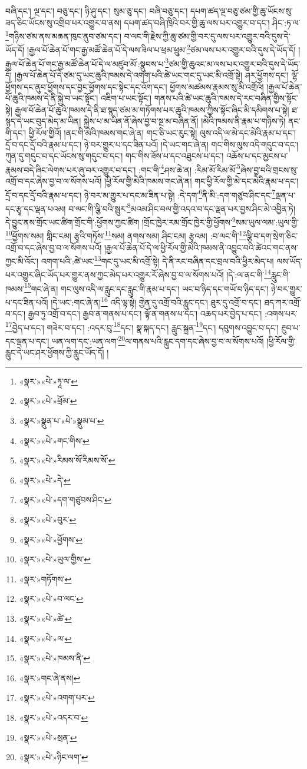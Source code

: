 བཞི་དང་། ལྔ་དང་། བཅུ་དང་། ཉི་ཤུ་དང་། སུམ་ཅུ་དང་། བཞི་བཅུ་དང་། དཔག་ཚད་ལྔ་བཅུ་ཙམ་གྱི་ཆུ་ཡོངས་སུ་ཟད་ཅིང་ཡོངས་སུ་འགྲིབ་པར་འགྱུར་བ་ནས། དཔག་ཚད་བཞི་ཁྲིའི་བར་གྱི་ཆུ་ལས་པར་འགྱུར་བ་དང་། ཤིང་:ཏ་ལ་\footnote{«སྣར་»«པེ་»ཏཱ་ལ་}གཉིས་ཙམ་ནས་མཆན་ཁུང་ནུབ་ཙམ་དང་། བ་ལང་གི་རྗེས་ཀྱི་ཆུ་ཙམ་གྱི་བར་དུ་ལས་པར་འགྱུར་བའི་དུས་དེ་ཡོད་དོ། །རྒྱལ་པོ་ཆེན་པོ་གང་རྒྱ་མཚོ་ཆེན་པོ་དེ་ལས་ཟིལ་པ་ཕྲམ་ཕྲུམ་\footnote{«སྣར་»«པེ་»ཕྲོམ་}ཙམ་ལས་པར་འགྱུར་བའི་དུས་དེ་ཡོད་དོ། །རྒྱལ་པོ་ཆེན་པོ་གང་རྒྱ་མཚོ་ཆེན་པོ་དེ་ལ་མཛུབ་མོ་:སྣུབས་པ་\footnote{«སྣར་»སྣུན་པ་«པེ་»སྣུམ་པ་}ཙམ་གྱི་ཆུའང་མ་ལས་པར་འགྱུར་བའི་དུས་དེ་ཡོད་དོ། །རྒྱལ་པོ་ཆེན་པོ་དེ་ཙམ་དུ་ཡང་ཆུའི་ཁམས་དེ་འགག་པའི་ཚེ་ཡང་གང་དུ་ཡང་མི་འགྲོ་སྟེ། ཤར་ཕྱོགས་དང་། ལྷོ་ཕྱོགས་དང་ནུབ་ཕྱོགས་དང་བྱང་ཕྱོགས་དང་སྟེང་དང་འོག་དང་། ཕྱོགས་མཚམས་རྣམས་སུ་མི་འགྲོའོ། །རྒྱལ་པོ་ཆེན་པོ་ཆུའི་ཁམས་དེ་ནི་སྐྱེ་བ་ཡང་སྟོང་། འཇིག་པ་ཡང་སྟོང་། གནས་པའི་ཚེ་ཡང་ཆུའི་ཁམས་དེ་རང་བཞིན་གྱིས་སྟོང་སྟེ། རྒྱལ་པོ་ཆེན་པོ་ཆུའི་ཁམས་དེ་ནི་ཐ་སྙད་ཙམ་མ་གཏོགས་པར་ཆུའི་ཁམས་ཀྱིས་སྟོང་ཞིང་མི་དམིགས་པ་སྟེ། ཐ་སྙད་དེ་ཡང་བུད་མེད་མ་ཡིན། སྐྱེས་པ་མ་ཡིན་ནོ་ཞེས་བྱ་བ་སྔ་མ་བཞིན་ནོ། །མེའི་ཁམས་ནི་རྣམ་པ་གཉིས་ཏེ། ནང་གི་དང་། ཕྱི་རོལ་གྱིའོ། །ནང་གི་མེའི་ཁམས་གང་ཞེ་ན། གང་ཅི་ཡང་རུང་སྟེ། ལུས་འདི་ལ་མེ་དང་མེའི་རྣམ་པ་དང་། དྲོ་བ་དང་དྲོ་བའི་རྣམ་པ་དང་། ཉེ་བར་གྱུར་པ་དང་ཟིན་པའོ། །དེ་ཡང་གང་ཞེ་ན། གང་གིས་ལུས་འདི་གདུང་བ་དང་། ཀུན་དུ་གདུང་བ་དང་ཡོངས་སུ་གདུང་བ་དང་། གང་གིས་ཟོས་པ་དང་འཐུངས་པ་དང་། འཆོས་པ་དང་མྱངས་པ་རྣམས་བདེ་ཞིང་ལེགས་པར་ཞུ་བར་འགྱུར་བ་དང་། :གང་གི་\footnote{«སྣར་»«པེ་»གང་གིས་}ཤས་ཆེ་ན། :རིམ་མོ་རིམ་མོ་\footnote{«སྣར་»«པེ་»རིམས་སོ་རིམས་སོ་}ཞེས་བྱ་བའི་གྲངས་སུ་འགྲོ་བ་དང་ཞེས་བྱ་བ་ལ་སོགས་པའོ། །ཕྱི་རོལ་གྱི་མེའི་ཁམས་གང་ཞེ་ན། གང་ཕྱི་རོལ་གྱི་མེ་དང་མེའི་རྣམ་པ་དང་། དྲོ་བ་དང་དྲོ་བའི་རྣམ་པ་དང་། ཉེ་བར་མ་གྱུར་པ་དང་མ་ཟིན་པ་སྟེ། :དེ་དག་\footnote{«སྣར་»«པེ་»དེ་}ནི་མི་:དག་གཙུབ་ཤིང་དང་\footnote{«སྣར་»«པེ་»དག་གཙུབས་ཤིང་}ལྡན་པ་དང་རྩྭ་དང་ལྡན་པའམ། བ་ལང་གི་ལྕི་བའི་སྦུར་\footnote{«སྣར་»«པེ་»བུར་}མའམ་ཤིང་བལ་གྱི་འདའ་བ་དང་ལྡན་པར་བྱས་ཤིང་མེ་འབྱིན་ཏེ། དེ་བྱུང་ནས་གྲོང་ཡང་ཚིག་གྲོང་གི་:ཕྱོགས་ཀྱང་ཚིག །གྲོང་ཁྱེར་རམ་གྲོང་ཁྱེར་གྱི་ཕྱོགས་\footnote{«སྣར་»«པེ་»ཕྱོགས་}སམ་ཡུལ་ལམ་:ཡུལ་གྱི་\footnote{«སྣར་»«པེ་»ཡུལ་གྱིས་}ཕྱོགས་སམ། གླིང་ངམ། རྩྭའི་གཏོས་\footnote{«སྣར་»གཏོགས་}སམ། ནགས་སམ། ཤིང་ངམ། རྩྭའམ། :བ་ལང་གི་\footnote{«སྣར་»«པེ་»བ་ལང་}ལྕི་བ་དག་སྲེག་ཅིང་འགྲོ་བ་དང་ཞེས་བྱ་བ་ལ་སོགས་པའོ། །རྒྱལ་པོ་ཆེན་པོ་དེ་ལ་ཕྱི་རོལ་གྱི་མེའི་ཁམས་ནི་འབྱུང་བའི་ཚེའང་གང་ནས་ཀྱང་མི་འོང་། འགག་པའི་:ཚེ་ཡང་\footnote{«སྣར་»«པེ་»ཚེ་}གང་དུ་ཡང་མི་འགྲོ་སྟེ། དེ་ནི་རང་བཞིན་དང་བྲལ་བའི་ཕྱིར་མེད་པ། ལས་ཡོད་པར་འགྱུར་ཞིང་ཡོད་པར་གྱུར་ནས་ཀྱང་མེད་པར་འགྱུར་རོ་ཞེས་བྱ་བ་ལ་སོགས་པའོ། །དེ་:ལ་ནང་གི་\footnote{«སྣར་»«པེ་»ལ་}རླུང་གི་ཁམས་\footnote{«སྣར་»«པེ་»ཁམས་ནི་}གང་ཞེ་ན། གང་ལུས་འདི་ལ་རླུང་དང་རླུང་གི་རྣམ་པ་དང་། ཡང་བ་ཉིད་དང་གཡོ་བ་ཉིད་དང་། ཉེ་བར་གྱུར་པ་དང་ཟིན་པའོ། །དེ་ཡང་:གང་ཞེ་ན།\footnote{«སྣར་»གང་ཞེ་ནས།} འདི་ལྟ་སྟེ། གྱེན་དུ་འགྲོ་བའི་རླུང་དང་། ཐུར་དུ་འགྲོ་བ་དང་། ཐད་ཀར་འགྲོ་བ་དང་། རྒྱབ་ཏུ་འགྲོ་བ་དང་། རྒྱབ་ན་གནས་པ་དང་། ལྟོ་ན་གནས་པ་དང་། འཆད་པར་བྱེད་པ་དང་། :འགས་པར་\footnote{«སྣར་»«པེ་»འགག་པར་}བྱེད་པ་དང་། གཟེར་བ་དང་། :འདར་བུ་\footnote{«སྣར་»«པེ་»འདར་བ་}དང་། སྣ་སྐད་དང་། རླུང་སྐྲན་\footnote{«སྣར་»«པེ་»སྲན་}དང་། དབུགས་འབྱུང་བ་དང་། རྔུབ་པ་དང་ལྡན་པ་དང་། ཡན་ལག་དང་:ཡན་ལག་\footnote{«སྣར་»«པེ་»ཉིང་ལག་}ལ་གནས་པའི་རླུང་དག་དང་ཞེས་བྱ་བ་ལ་སོགས་པའོ། །ཕྱི་རོལ་གྱི་རླུང་དེ་ཡང་ཤར་ཕྱོགས་ཀྱི་རླུང་ཡོད་དོ། །
